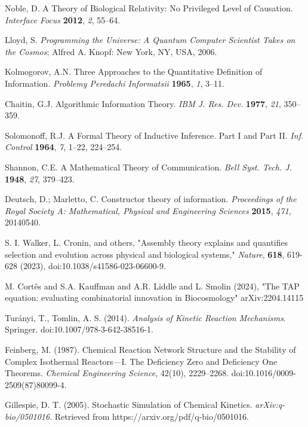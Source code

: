\documentclass[preprint,12pt]{elsarticle}
\begin{document}
\begin{thebibliography}{999}
Noble, D. A Theory of Biological Relativity: No Privileged Level of Causation. \textit{Interface Focus} \textbf{2012}, \textit{2}, 55–64.

Lloyd, S. \textit{Programming the Universe: A Quantum Computer Scientist Takes on the Cosmos}; Alfred A. Knopf: New York, NY, USA, 2006.

Kolmogorov, A.N. Three Approaches to the Quantitative Definition of Information. \textit{Problemy Peredachi Informatsii} \textbf{1965}, \textit{1}, 3–11.

Chaitin, G.J. Algorithmic Information Theory. \textit{IBM J. Res. Dev.} \textbf{1977}, \textit{21}, 350–359. 

Solomonoff, R.J. A Formal Theory of Inductive Inference. Part I and Part II. \textit{Inf. Control} \textbf{1964}, \textit{7}, 1–22, 224–254.

Shannon, C.E. A Mathematical Theory of Communication. \textit{Bell Syst. Tech. J.} \textbf{1948}, \textit{27}, 379–423.

Deutsch, D.; Marletto, C. Constructor theory of information. \textit{Proceedings of the Royal Society A: Mathematical, Physical and Engineering Sciences} \textbf{2015}, \textit{471}, 20140540. 

S. I. Walker, L. Cronin, and others,
"Assembly theory explains and quantifies selection and evolution across physical and biological systems," \textit{Nature}, \textbf{618}, 619-628 (2023), doi:10.1038/s41586-023-06600-9.

M. Cortês and S.A. Kauffman and A.R. Liddle and L. Smolin (2024), "The TAP equation: evaluating combinatorial innovation in Biocosmology" arXiv:2204.14115


Turányi, T., Tomlin, A. S. (2014). \textit{Analysis of Kinetic Reaction Mechanisms}. Springer. doi:10.1007/978-3-642-38516-1.

Feinberg, M. (1987). Chemical Reaction Network Structure and the Stability of Complex Isothermal Reactors—I. The Deficiency Zero and Deficiency One Theorems. \textit{Chemical Engineering Science}, 42(10), 2229–2268. doi:10.1016/0009-2509(87)80099-4.

Gillespie, D. T. (2005). Stochastic Simulation of Chemical Kinetics. \textit{arXiv:q-bio/0501016}. Retrieved from https://arxiv.org/pdf/q-bio/0501016.


\end{thebibliography}
\end{document}
